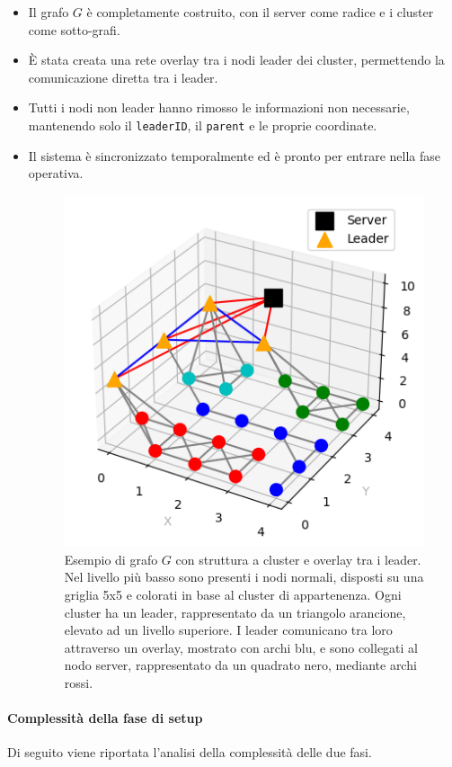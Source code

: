 \documentclass[12pt, a4paper]{report}
\begin{document}
\begin{itemize}
    \item Il grafo $G$ \`e completamente costruito, con il server come radice e i cluster come sotto-grafi.
    \item \`E stata creata una rete overlay tra i nodi leader dei cluster, permettendo la comunicazione diretta tra i leader.
    \item Tutti i nodi non leader hanno rimosso le informazioni non necessarie, mantenendo solo il \texttt{leaderID}, il \texttt{parent} e le proprie coordinate.
    \item Il sistema \`e sincronizzato temporalmente ed \`e pronto per entrare nella fase operativa.

\begin{figure}
    \centering
    \includegraphics[width=0.5\linewidth]{images/setup/Esempio_Grafo_G.png}
    \caption{Esempio di grafo $G$ con struttura a cluster e overlay tra i leader. Nel livello pi\`u basso sono presenti i nodi normali, disposti su una griglia 5x5 e colorati in base al cluster di appartenenza. Ogni cluster ha un leader, rappresentato da un triangolo arancione, elevato ad un livello superiore. I leader comunicano tra loro attraverso un overlay, mostrato con archi blu, e sono collegati al nodo server, rappresentato da un quadrato nero, mediante archi rossi.}
    \label{fig:enter-label}
\end{figure}

\end{itemize}

\paragraph{Complessit\`a della fase di setup}

Di seguito viene riportata l'analisi della complessit\`a delle due fasi.
\end{document}
